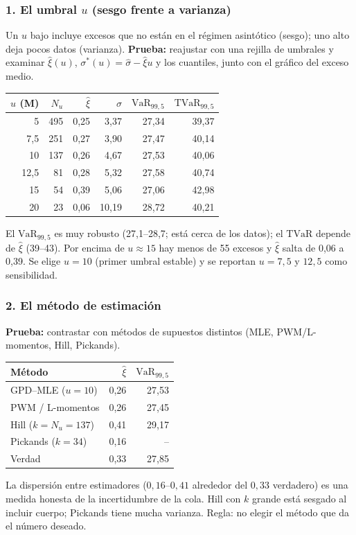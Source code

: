 \documentclass[a4paper,12pt]{article}
\newcommand{\euro}{\texteuro}
\newcommand{\VaR}{\mathrm{VaR}}
\newcommand{\TVaR}{\mathrm{TVaR}}
\begin{document}
\subsubsection*{1. El umbral $u$ (sesgo frente a varianza)}
Un $u$ bajo incluye excesos que no est\'an en el r\'egimen asint\'otico (sesgo); uno alto deja pocos datos (varianza). \textbf{Prueba:} reajustar con una rejilla de umbrales y examinar $\hat\xi(u)$, $\sigma^*(u)=\hat\sigma-\hat\xi u$ y los cuantiles, junto con el gr\'afico del exceso medio.
\begin{center}
\small
\begin{tabular}{rrrrrr}
\toprule
$u$ (M\euro) & $N_u$ & $\hat\xi$ & $\hat\sigma$ & $\VaR_{99,5}$ & $\TVaR_{99,5}$\\
\midrule
5 & 495 & 0,25 & 3,37 & 27,34 & 39,37\\
7,5 & 251 & 0,27 & 3,90 & 27,47 & 40,14\\
10 & 137 & 0,26 & 4,67 & 27,53 & 40,06\\
12,5 & 81 & 0,28 & 5,32 & 27,58 & 40,74\\
15 & 54 & 0,39 & 5,06 & 27,06 & 42,98\\
20 & 23 & 0,06 & 10,19 & 28,72 & 40,21\\
\bottomrule
\end{tabular}
\end{center}
El $\VaR_{99,5}$ es muy robusto (27,1--28,7; est\'a cerca de los datos); el $\TVaR$ depende de $\hat\xi$ (39--43). Por encima de $u\approx15$ hay menos de 55 excesos y $\hat\xi$ salta de 0,06 a 0,39. Se elige $u=10$ (primer umbral estable) y se reportan $u=7{,}5$ y $12{,}5$ como sensibilidad.

\subsubsection*{2. El m\'etodo de estimaci\'on}
\textbf{Prueba:} contrastar con m\'etodos de supuestos distintos (MLE, PWM/L-momentos, Hill, Pickands).
\begin{center}
\small
\begin{tabular}{lrr}
\toprule
M\'etodo & $\hat\xi$ & $\VaR_{99,5}$\\
\midrule
GPD--MLE ($u=10$) & 0,26 & 27,53\\
PWM / L-momentos & 0,26 & 27,45\\
Hill ($k=N_u=137$) & 0,41 & 29,17\\
Pickands ($k=34$) & 0,16 & --\\
Verdad & 0,33 & 27,85\\
\bottomrule
\end{tabular}
\end{center}
La dispersi\'on entre estimadores ($0{,}16$--$0{,}41$ alrededor del $0{,}33$ verdadero) es una medida honesta de la incertidumbre de la cola. Hill con $k$ grande est\'a sesgado al incluir cuerpo; Pickands tiene mucha varianza. Regla: no elegir el m\'etodo que da el n\'umero deseado.
\end{document}
